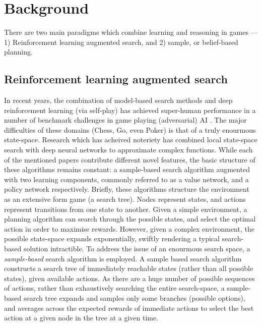 \section{Background}
There are two main paradigms which combine learning and reasoning in games --- 1) Reinforcement learning augmented search, and 2) sample, or belief-based planning. 

\subsection{Reinforcement learning augmented search} \label{RL + Search}
In recent years, the combination of model-based search methods and deep reinforcement learning (via self-play) has achieved super-human performance in a number of benchmark challenges in game playing (adversarial) AI \cite{AlphaGo,Brown2020,Lerer2019}. 
The major difficulties of these domains (Chess, Go, even Poker) is that of a truly enourmous state-space. Research which has acheived noteriety has combined local state-space search with deep neural networks to approximate complex functions. 
\newline \newline
While each of the mentioned papers contribute different novel features, the basic structure of these algorithms remains constant: a sample-based search algorithm augmented with two learning components, commonly referred to as a value network, and a policy network respectively.
\newline \newline
Briefly, these algorithms structure the environment as an extensive form game (a search tree). Nodes represent states, and actions represent transitions from one state to another. Given a simple environment, a planning algorithm can search through the possible states, and select the optimal action in order to maximise rewards. However, given a complex environment, the possible state-space expands exponentially, swiftly rendering a typical search-based solution intractible. To address the issue of an enourmous search space, a \textit{sample-based} search algorithm is employed. 
\newline \newline
A sample based search algorithm constructs a search tree of immediately reachable states (rather than all possible states), given available actions. As there are a huge number of possible sequences of actions, rather than exhaustively searching the entire search-space, a sample-based search tree expands and samples only some branches (possible options), and averages across the expected rewards of immediate actions to select the best action at a given node in the tree at a given time.
